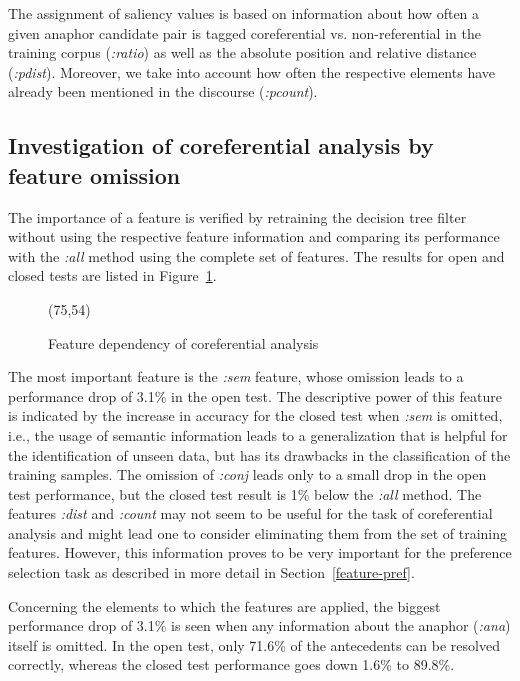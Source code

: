 The assignment of saliency values is based on information about how often a given anaphor candidate pair
is tagged coreferential vs. non-referential in the training corpus ({\em :ratio}) as well as 
the absolute position and relative distance ({\em :pdist}). Moreover, we take into account how often
the respective elements have already been mentioned in the discourse ({\em :pcount}).

\subsection{Investigation of coreferential analysis by feature omission}
\label{feature-coref}

The importance of a feature is verified by retraining the decision tree filter without 
using the respective feature information and comparing its performance with the {\em :all} method
using the complete set of features.
The results for open and closed tests are listed in Figure~\ref{pic-feature-coref}.
\begin{figure}[ht]
  \begin{center}
    \vspace*{-0.5\baselineskip}
\atari(75,54)
    \vspace*{-0.25\baselineskip}
    \caption{Feature dependency of coreferential analysis}\label{pic-feature-coref}
  \vspace*{-0.75\baselineskip}
  \end{center}
\end{figure}

The most important feature is the {\em :sem} feature, whose omission leads to a performance drop of 3.1\% in the
open test. The descriptive power of this feature is indicated by the increase in accuracy for the closed test when
{\em :sem} is omitted, i.e., the usage of semantic information leads to a generalization that is helpful
for the identification of unseen data, but has its drawbacks in the classification of the training samples.
The omission of {\em :conj} leads only to a small drop in the open test performance, but
the closed test result is 1\% below the {\em :all} method.
The features {\em :dist} and {\em :count} may not seem to be useful for the task of coreferential analysis
and might lead one to consider eliminating them from the set of training features.
However, this information proves to be very important for the preference selection task as described
in more detail in Section~\ref{feature-pref}.

Concerning the elements to which the features are applied, the biggest performance drop of 3.1\% is seen
when any information about the anaphor ({\em :ana}) itself is omitted. In the open test, only 71.6\% of
the antecedents can be resolved correctly, whereas the closed test performance goes down 1.6\% to 89.8\%. 

